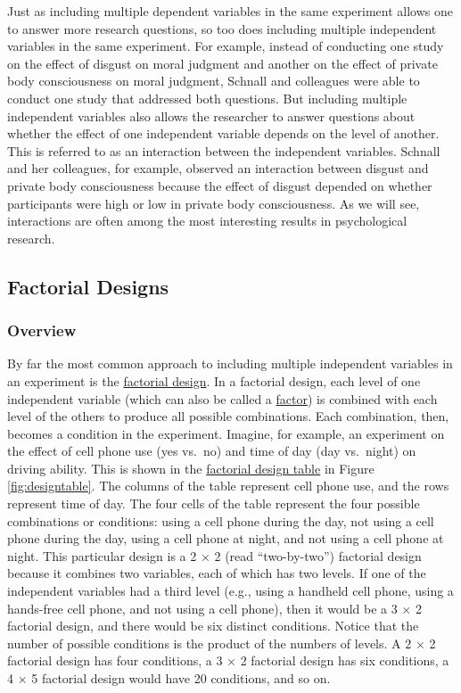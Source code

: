 \documentclass[
]{krantz}
\begin{document}
Just as including multiple dependent variables in the same experiment allows one to answer more research questions, so too does including multiple independent variables in the same experiment. For example, instead of conducting one study on the effect of disgust on moral judgment and another on the effect of private body consciousness on moral judgment, Schnall and colleagues were able to conduct one study that addressed both questions. But including multiple independent variables also allows the researcher to answer questions about whether the effect of one independent variable depends on the level of another. This is referred to as an interaction between the independent variables. Schnall and her colleagues, for example, observed an interaction between disgust and private body consciousness because the effect of disgust depended on whether participants were high or low in private body consciousness. As we will see, interactions are often among the most interesting results in psychological research.

\hypertarget{factorial-designs}{%
\subsection*{Factorial Designs}\label{factorial-designs}}


\hypertarget{overview-1}{%
\subsubsection*{Overview}\label{overview-1}}


By far the most common approach to including multiple independent variables in an experiment is the \protect\hyperlink{factorial-design}{factorial design}. In a factorial design, each level of one independent variable (which can also be called a \protect\hyperlink{factor}{factor}) is combined with each level of the others to produce all possible combinations. Each combination, then, becomes a condition in the experiment. Imagine, for example, an experiment on the effect of cell phone use (yes vs.~no) and time of day (day vs.~night) on driving ability. This is shown in the \protect\hyperlink{factorial-design-table}{factorial design table} in Figure \ref{fig:designtable}. The columns of the table represent cell phone use, and the rows represent time of day. The four cells of the table represent the four possible combinations or conditions: using a cell phone during the day, not using a cell phone during the day, using a cell phone at night, and not using a cell phone at night. This particular design is a 2 × 2 (read ``two-by-two'') factorial design because it combines two variables, each of which has two levels. If one of the independent variables had a third level (e.g., using a handheld cell phone, using a hands-free cell phone, and not using a cell phone), then it would be a 3 × 2 factorial design, and there would be six distinct conditions. Notice that the number of possible conditions is the product of the numbers of levels. A 2 × 2 factorial design has four conditions, a 3 × 2 factorial design has six conditions, a 4 × 5 factorial design would have 20 conditions, and so on.
\end{document}
